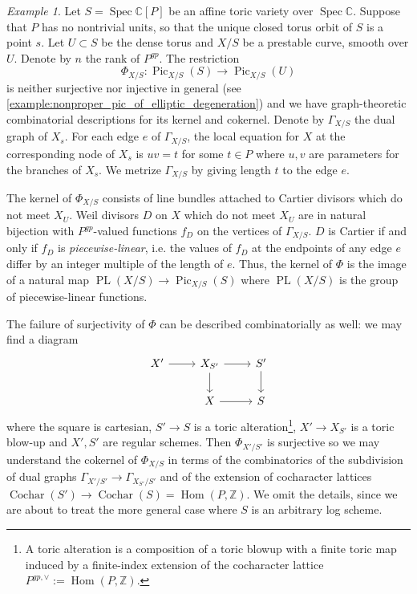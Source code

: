 \documentclass[a4paper,11pt]{amsart} %
\numberwithin{equation}{subsection}
\newcommand{\on}[1]{\operatorname{#1}}
\newcommand{\bb}[1]{{\mathbb{#1}}}
\theoremstyle{definition}
\theoremstyle{plain}%
\theoremstyle{remark}
\newtheorem{example}[definition]{Example}
\begin{document}
\begin{example}\label{example:logpic_over_affine_TV}
    Let $S=\on{Spec} \bb C[P]$ be an affine toric variety over $\on{Spec} \bb C$. Suppose that $P$ has no nontrivial units, so that the unique closed torus orbit of $S$ is a point $s$. Let $U \subset S$ be the dense torus and $X/S$ be a prestable curve, smooth over $U$. Denote by $n$ the rank of $P^{gp}$. The restriction
    \[
    \Phi_{X/S} \colon \on{Pic}_{X/S}(S) \to \on{Pic}_{X/S}(U)
    \]
    is neither surjective nor injective in general (see \ref{example:nonproper_pic_of_elliptic_degeneration}) and we have graph-theoretic combinatorial descriptions for its kernel and cokernel. Denote by $\Gamma_{X/S}$ the dual graph of $X_s$. For each edge $e$ of $\Gamma_{X/S}$, the local equation for $X$ at the corresponding node of $X_s$ is $uv=t$ for some $t\in P$ where $u,v$ are parameters for the branches of $X_s$. We metrize $\Gamma_{X/S}$ by giving length $t$ to the edge $e$.

    The kernel of $\Phi_{X/S}$ consists of line bundles attached to Cartier divisors which do not meet $X_U$. Weil divisors $D$ on $X$ which do not meet $X_U$ are in natural bijection with $P^{gp}$-valued functions $f_D$ on the vertices of $\Gamma_{X/S}$. $D$ is Cartier if and only if $f_D$ is \emph{piecewise-linear}, i.e. the values of $f_D$ at the endpoints of any edge $e$ differ by an integer multiple of the length of $e$. Thus, the kernel of $\Phi$ is the image of a natural map $\on{PL}(X/S) \to \on{Pic}_{X/S}(S)$ where $\on{PL}(X/S)$ is the group of piecewise-linear functions.
    
    The failure of surjectivity of $\Phi$ can be described combinatorially as well: we may find a diagram
    \[
    \begin{tikzcd}
        X' \arrow[r] & X_{S'} \arrow[r]\arrow[d] & S'\arrow[d] \\
        & X \arrow[r] & S
    \end{tikzcd}
    \]
    where the square is cartesian, $S' \to S$ is a toric alteration\footnote{A toric alteration is a composition of a toric blowup with a finite toric map induced by a finite-index extension of the cocharacter lattice $P^{gp,\vee}:=\on{Hom}(P,\bb Z)$.}, $X' \to X_{S'}$ is a toric blow-up and $X',S'$ are regular schemes. Then $\Phi_{X'/S'}$ is surjective so we may understand the cokernel of $\Phi_{X/S}$ in terms of the combinatorics of the subdivision of dual graphs $\Gamma_{X'/S'} \to \Gamma_{X_{S'}/S'}$ and of the extension of cocharacter lattices $\on{Cochar}(S') \to \on{Cochar}(S) = \on{Hom}(P,\bb Z)$. We omit the details, since we are about to treat the more general case where $S$ is an arbitrary log scheme.
\end{example}
\end{document}
